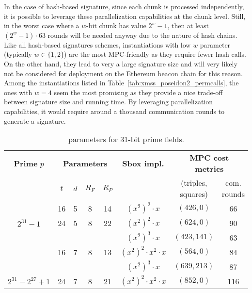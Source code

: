 In the case of hash-based signature, since each chunk is processed independently, it is possible to leverage these parallelization capabilities at the chunk level.
Still, in the worst case where a $w$-bit chunk has value $2^w-1$, then at least $(2^w-1) \cdot 63$ rounds will be needed anyway due to the nature of hash chains.
Like all hash-based signatures schemes, instantiations with low $w$ parameter (typically $w \in \{1,2\}$) are the most MPC-friendly as they require fewer hash calls.
On the other hand, they lead to very a large signature size and will very likely not be considered for deployment on the Ethereum beacon chain for this reason.
Among the instantiations listed in Table~\ref{tab:xmss_poseidon2_permcalls}, the ones with $w=4$ seem the most promising as they provide a nice trade-off between signature size and running time.
By leveraging parallelization capabilities, it would require around a thousand communication rounds to generate a signature. 

\renewcommand\arraystretch{1.25}
\begin{table}[t]
	\centering
	\begin{tabular}{cccccccc}
		\toprule
    		\textbf{Prime} $p$ & \multicolumn{4}{c}{\textbf{Parameters}} & \textbf{Sbox impl.} & \multicolumn{2}{c}{\textbf{MPC cost metrics}}\\
    		 & {$t$} & {$d$} & {$R_F$} & {$R_P$} & & (triples, squares) & com. rounds\\
    		\midrule
    		& 16 & 5 & 8 & 14 & $(x^2)^2 \cdot x$ & $(426, 0)$ & 66 \\
    		\multirow{-2}{*}{$2^{31}-1$} & 24 & 5 & 8 & 22 &  $(x^2)^2 \cdot x$ & $(624, 0)$ & 90\\
    		\midrule
    		& & & & & $(x^2)^3 \cdot x$ & $(423, 141)$ & 63\\
    		& \multirow{-2}{*}{16} & \multirow{-2}{*}{7} & \multirow{-2}{*}{8} & \multirow{-2}{*}{13} & $(x^2)^2 \cdot x^2 \cdot x$ & $(564, 0)$ & 84\\
    	    & & & & & $(x^2)^3 \cdot x$ & $(639, 213)$  & 87\\
    		\multirow{-4}{*}{$2^{31}-2^{27} + 1$}  & \multirow{-2}{*}{24}  & \multirow{-2}{*}{7} & \multirow{-2}{*}{8} & \multirow{-2}{*}{21} &  $(x^2)^2 \cdot x^2 \cdot x$  & $(852, 0)$ & 116\\
    		\bottomrule
	\end{tabular}
	\caption{\PoseidonTwoPi parameters for 31-bit prime fields.\label{tab:poseidon2_inst31}}
\end{table}

